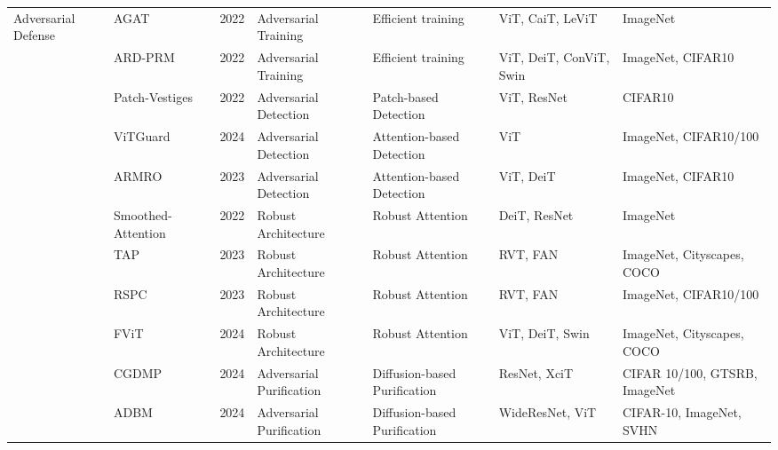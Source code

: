 \begin{table*}[htp]
{\begin{tabular}{p{}p{}p{}p{}p{}p{}p{}}
\multirow{7}{0.08\textwidth}{Adversarial Defense}& AGAT~\cite{wu2022towards} & 2022 & Adversarial Training & Efficient training & ViT, CaiT, LeViT & ImageNet \\
                   & \cellcolor{gray!15!}ARD-PRM~\cite{mo2022adversarial} & \cellcolor{gray!15!}2022 & \cellcolor{gray!15!}Adversarial Training & \cellcolor{gray!15!}Efficient training & \cellcolor{gray!15!}ViT, DeiT, ConViT, Swin & \cellcolor{gray!15!}ImageNet, CIFAR10 \\
                   & Patch-Vestiges~\cite{li2022patch} & 2022 & Adversarial Detection & Patch-based Detection & ViT, ResNet & CIFAR10 \\
                   & \cellcolor{gray!15!}ViTGuard~\cite{sun2024vitguard} & \cellcolor{gray!15!}2024 & \cellcolor{gray!15!}Adversarial Detection & \cellcolor{gray!15!}Attention-based Detection & \cellcolor{gray!15!}ViT & \cellcolor{gray!15!}ImageNet, CIFAR10/100 \\
                   & ARMRO~\cite{liu2023understanding} & 2023 & Adversarial Detection & Attention-based Detection & ViT, DeiT & ImageNet, CIFAR10 \\
                   & \cellcolor{gray!15!}Smoothed-Attention~\cite{gu2022vision} & \cellcolor{gray!15!}2022 & \cellcolor{gray!15!}Robust Architecture & \cellcolor{gray!15!}Robust Attention & \cellcolor{gray!15!}DeiT, ResNet & \cellcolor{gray!15!}ImageNet \\
                   & TAP~\cite{guo2023robustifying} & 2023 & Robust Architecture & Robust Attention & RVT, FAN & ImageNet, Cityscapes, COCO \\
                   & \cellcolor{gray!15!}RSPC~\cite{guo2023improving} & \cellcolor{gray!15!}2023 & \cellcolor{gray!15!}Robust Architecture & \cellcolor{gray!15!}Robust Attention & \cellcolor{gray!15!}RVT, FAN & \cellcolor{gray!15!}ImageNet, CIFAR10/100 \\
                   & FViT~\cite{huimproving} & 2024 & Robust Architecture & Robust Attention & ViT, DeiT, Swin & ImageNet, Cityscapes, COCO \\
                   & \cellcolor{gray!15!}CGDMP~\cite{bai2024diffusion} & \cellcolor{gray!15!}2024 & \cellcolor{gray!15!}Adversarial Purification & \cellcolor{gray!15!}Diffusion-based Purification & \cellcolor{gray!15!}ResNet, XciT & \cellcolor{gray!15!}CIFAR 10/100, GTSRB, ImageNet\\
                   & ADBM~\cite{li2024adbm} & 2024 & Adversarial Purification & Diffusion-based Purification & WideResNet, ViT & CIFAR-10, ImageNet, SVHN \\ 

\end{tabular}}
\end{table*}
